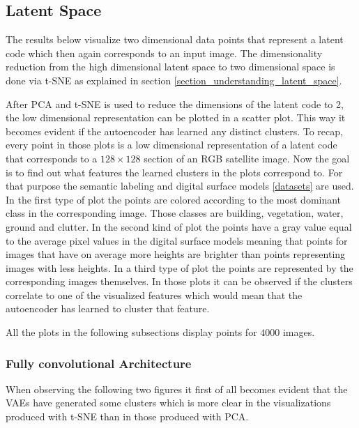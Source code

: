 
\subsection{Latent Space} \label{latent_space_experiments}

The results below visualize two dimensional data points that represent a latent code which then again corresponds
to an input image. The dimensionality reduction from the high dimensional latent space to two dimensional space
is done via t-SNE as  explained in section \ref{section_understanding_latent_space}.

After PCA and t-SNE is used to reduce the dimensions of the latent code to 2, the low dimensional representation can be
plotted in a scatter plot. This way it becomes evident if the autoencoder has learned any distinct clusters.
To recap, every point in those plots is a low dimensional representation of a latent code that corresponds to
a $128 \times 128$ section of an RGB satellite image. 
Now the goal is to find out what features the learned clusters in the plots correspond to. For that purpose the
semantic labeling and digital surface models \ref{datasets} are used. In the first type of plot the points
are colored according to the most dominant class in the corresponding image. Those classes are building, vegetation,
water, ground and clutter. In the second kind of plot the points have a gray value equal to the average pixel
values in the digital surface models meaning that points for images that have on average more heights are brighter
than points representing images with less heights.
In a third type of plot the points are represented by the corresponding images themselves.
In those plots it can be observed if the clusters correlate to one of the visualized features which would mean that
the autoencoder has learned to cluster that feature.

All the plots in the following subsections display points for $4000$ images.

\subsubsection{Fully convolutional Architecture}
When observing the following two figures it first of all becomes evident that the VAEs have generated some clusters
which is more clear in the visualizations produced with t-SNE than in those produced with PCA.

